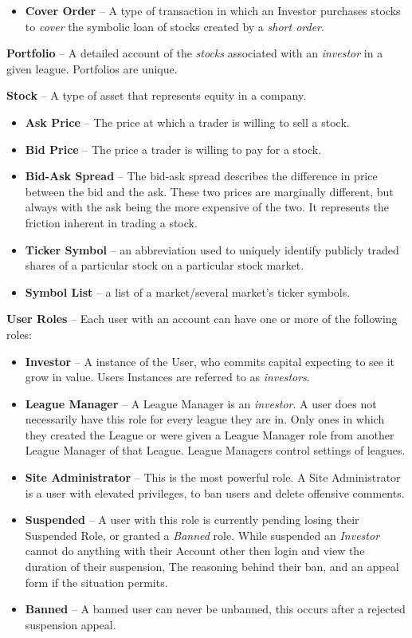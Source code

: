 {\begin{itemize}
\begin{itemize}
		a certain number of stocks (using their existing Margin) and sells them at market price,
		expecting the stock value to decrease and to make a profit when exiting the position. 
		Exiting is called a \emph{cover}. \cite{inv:short}
	\item \textbf{Cover Order} -- A type of transaction in which an Investor purchases stocks to 
		\emph{cover} the symbolic loan of stocks created by a \emph{short order}. \cite{inv:cover}
	\end{itemize}
\end{itemize}
\textbf{Portfolio} -- A detailed account of the \emph{stocks} associated with an \emph{investor} 
in a given league. Portfolios are unique. 

\textbf{Stock} -- A type of asset that represents equity in a company.
\begin{itemize}
\item \textbf{Ask Price} -- The price at which a trader is willing to sell a stock.
\item \textbf{Bid Price} -- The price a trader is willing to pay for a stock.
\item \textbf{Bid-Ask Spread} -- The bid-ask spread describes the difference in price between the bid and the ask. These two prices are marginally different, but always with the ask being the more expensive of the two. It represents the friction inherent in trading a stock. \cite{inv:bidask}
\item \textbf{Ticker Symbol} -- an abbreviation used to uniquely identify publicly traded shares of a particular stock on a particular stock market.
\item \textbf{Symbol List} -- a list of a market/several market's ticker symbols.
\end{itemize}
\textbf{User Roles} -- Each user with an account can have one or more of the following roles:
\begin{itemize}
\item \textbf{Investor} -- A instance of the User, who commits capital expecting to see it grow in value. Users Instances are referred 
to as \emph{investors}. 
\item \textbf{League Manager} -- A League Manager is an \emph{investor}.  A user does not necessarily have this role for every league they are in.  Only ones in which they created the League or were given a League Manager role from another League Manager of that League. League Managers control settings of leagues.
\item \textbf{Site Administrator} -- This is the most powerful role. A Site Administrator is a user with elevated privileges, to ban users and delete offensive comments.
\item \textbf{Suspended} -- A user with this role is currently pending losing their Suspended Role, or granted a \emph{Banned} role.  While suspended an \emph{Investor} cannot do anything with their Account other then login and view the duration of their suspension, The reasoning behind their ban, and an appeal form if the situation permits.
\item \textbf{Banned} -- A banned user can never be unbanned, this occurs after a rejected suspension appeal.
\end{itemize}
}
